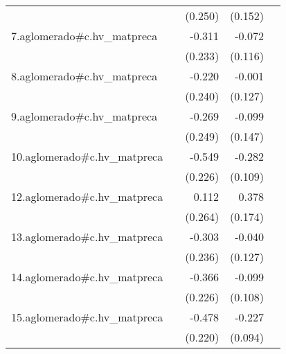 {\begin{longtable}{l*{4}{D{.}{.}{-1}}}
            &                     &     (0.250)         &     (0.152)         &                     \\
\addlinespace
7.aglomerado#c.hv\_matpreca&                     &      -0.311         &      -0.072         &                     \\
            &                     &     (0.233)         &     (0.116)         &                     \\
\addlinespace
8.aglomerado#c.hv\_matpreca&                     &      -0.220         &      -0.001         &                     \\
            &                     &     (0.240)         &     (0.127)         &                     \\
\addlinespace
9.aglomerado#c.hv\_matpreca&                     &      -0.269         &      -0.099         &                     \\
            &                     &     (0.249)         &     (0.147)         &                     \\
\addlinespace
10.aglomerado#c.hv\_matpreca&                     &      -0.549\sym{*}  &      -0.282\sym{**} &                     \\
            &                     &     (0.226)         &     (0.109)         &                     \\
\addlinespace
12.aglomerado#c.hv\_matpreca&                     &       0.112         &       0.378\sym{*}  &                     \\
            &                     &     (0.264)         &     (0.174)         &                     \\
\addlinespace
13.aglomerado#c.hv\_matpreca&                     &      -0.303         &      -0.040         &                     \\
            &                     &     (0.236)         &     (0.127)         &                     \\
\addlinespace
14.aglomerado#c.hv\_matpreca&                     &      -0.366         &      -0.099         &                     \\
            &                     &     (0.226)         &     (0.108)         &                     \\
\addlinespace
15.aglomerado#c.hv\_matpreca&                     &      -0.478\sym{*}  &      -0.227\sym{*}  &                     \\
            &                     &     (0.220)         &     (0.094)         &                     \\

\end{longtable}}
